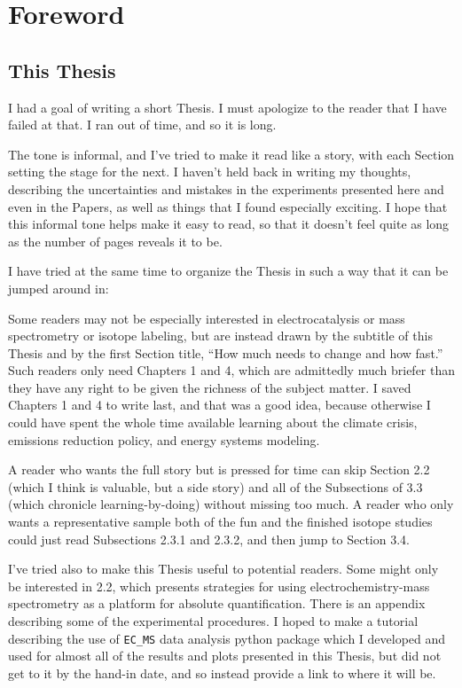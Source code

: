 \chapter*{Foreword}

\section*{This Thesis}

I had a goal of writing a short Thesis. I must apologize to the reader that I have failed at that. I ran out of time, and so it is long.

The tone is informal, and I've tried to make it read like a story, with each Section setting the stage for the next. I haven't held back in writing my thoughts, describing the uncertainties and mistakes in the experiments presented here and even in the Papers, as well as things that I found especially exciting. I hope that this informal tone helps make it easy to read, so that it doesn't feel quite as long as the number of pages reveals it to be.

I have tried at the same time to organize the Thesis in such a way that it can be jumped around in: 

Some readers may not be especially interested in electrocatalysis or mass spectrometry or isotope labeling, but are instead drawn by the subtitle of this Thesis and by the first Section title, ``How much needs to change and how fast.'' Such readers only need Chapters 1 and 4, which are admittedly much briefer than they have any right to be given the richness of the subject matter. I saved Chapters 1 and 4 to write last, and that was a good idea, because otherwise I could have spent the whole time available learning about the climate crisis, emissions reduction policy, and energy systems modeling.

A reader who wants the full story but is pressed for time can skip Section 2.2 (which I think is valuable, but a side story) and all of the Subsections of 3.3 (which chronicle learning-by-doing) without missing too much. A reader who only wants a representative sample both of the fun and the finished isotope studies could just read Subsections 2.3.1 and 2.3.2, and then jump to Section 3.4. 

I've tried also to make this Thesis useful to potential readers. Some might only be interested in 2.2, which presents strategies for using electrochemistry-mass spectrometry as a platform for absolute quantification. There is an appendix describing some of the experimental procedures. I hoped to make a tutorial describing the use of \texttt{EC\_MS} data analysis python package which I developed and used for almost all of the results and plots presented in this Thesis, but did not get to it by the hand-in date, and so instead provide a link to where it will be.

